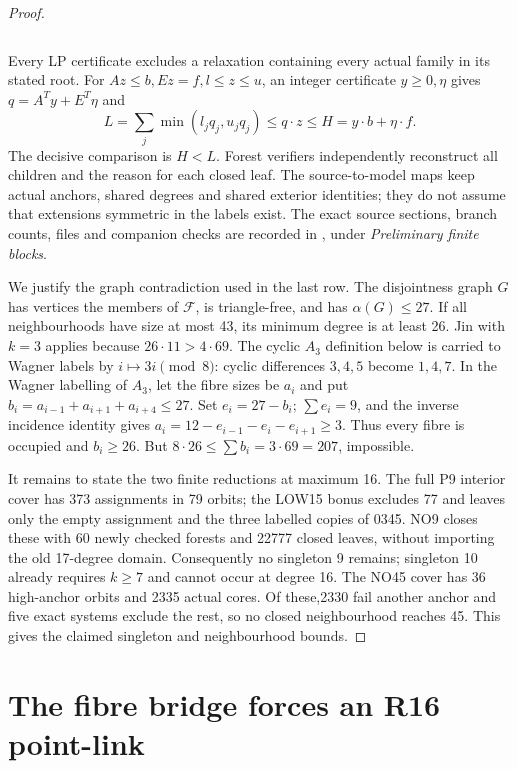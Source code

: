\documentclass[11pt,a4paper]{article}
\numberwithin{equation}{section}
\theoremstyle{remark}
\newcommand{\F}{\mathcal F}
\begin{document}
\begin{proof}
\begin{center}
\begin{tabular}{c p{9.5cm}}
\end{tabular}
\end{center}
Every LP certificate excludes a relaxation containing every actual
family in its stated root. For $ Az\le b,Ez=f,l\le z\le u $, an integer
certificate $ y\ge 0,\eta $ gives $ q=A^Ty+E^T\eta $ and
\[
 L=\sum_j\min(l_jq_j,u_jq_j)\le q\cdot z
 \le H=y\cdot b+\eta\cdot f.
\]
The decisive comparison is $ H<L $. Forest verifiers independently
reconstruct all children and the reason for each closed leaf. The
source-to-model maps keep actual anchors, shared degrees and shared
exterior identities; they do not assume that extensions symmetric in
the labels exist. The exact source sections, branch counts, files and
companion checks are recorded in , under
\emph{Preliminary finite blocks}.

We justify the graph contradiction used in the last row. The
disjointness graph $ G $ has vertices the members of $\F $, is
triangle-free, and has $\alpha(G)\le 27$. If all neighbourhoods have
size at most 43, its minimum degree is at least 26. Jin with $ k=3$
applies because $26\cdot 11>4\cdot 69$. The cyclic $ A_3$ definition
below is carried to Wagner labels by $ i\mapsto 3i\pmod 8$:
cyclic differences $3,4,5$ become $1,4,7$. In the Wagner labelling of
$ A_3$, let the fibre sizes be $ a_i $ and put
$ b_i=a_{i-1}+a_{i+1}+a_{i+4}\le 27$. Set $ e_i=27-b_i $;
$\sum e_i=9$, and the inverse incidence identity gives
$ a_i=12-e_{i-1}-e_i-e_{i+1}\ge 3$. Thus every fibre is occupied and
$ b_i\ge 26$. But $8\cdot 26\le\sum b_i=3\cdot 69=207$, impossible.

It remains to state the two finite reductions at maximum 16. The full
P9 interior cover has 373 assignments in 79 orbits; the LOW15 bonus
excludes 77 and leaves only the empty assignment and the three labelled
copies of 0345. NO9 closes these with 60 newly checked forests and 22777
closed leaves, without importing the old 17-degree domain. Consequently
no singleton 9 remains; singleton 10 already requires $ k\ge 7$ and cannot
occur at degree 16. The NO45 cover has 36 high-anchor orbits and 2335
actual cores. Of these,2330 fail another anchor and five exact systems
exclude the rest, so no closed neighbourhood reaches 45. This gives
the claimed singleton and neighbourhood bounds.
\end{proof}

\section{The fibre bridge forces an R16 point-link}
\label{sec:fibrebridge}
\end{document}
